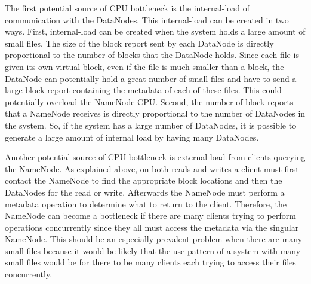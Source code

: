 \documentclass[11pt, a4paper]{article}
\begin{document}
\begin{multicols*}{2}

The first potential source of CPU bottleneck is the internal-load of communication with the DataNodes. This internal-load can be created in two ways. First, internal-load can be created when the system holds a large amount of small files. The size of the block report sent by each DataNode is directly proportional to the number of blocks that the DataNode holds. Since each file is given its own virtual block, even if the file is much smaller than a block, the DataNode can potentially hold a great number of small files and have to send a large block report containing the metadata of each of these files. This could potentially overload the NameNode CPU. 
Second, the number of block reports that a NameNode receives is directly proportional to the number of DataNodes in the system. So, if the system has a large number of DataNodes, it is possible to generate a large amount of internal load by having many DataNodes.  




Another potential source of CPU bottleneck is external-load from clients querying the NameNode. As explained above, on both reads and writes a client must first contact the NameNode to find the appropriate block locations and then the DataNodes for the read or write. Afterwards the NameNode must perform a metadata operation to determine what to return to the client. Therefore, the NameNode can become a bottleneck if there are many clients trying to perform operations concurrently since they all must access the metadata via the singular NameNode. This should be an especially prevalent problem when there are many small files because it would be likely that the use pattern of a system with many small files would be for there to be many clients each trying to access their files concurrently. 


\end{multicols*}
\end{document}
